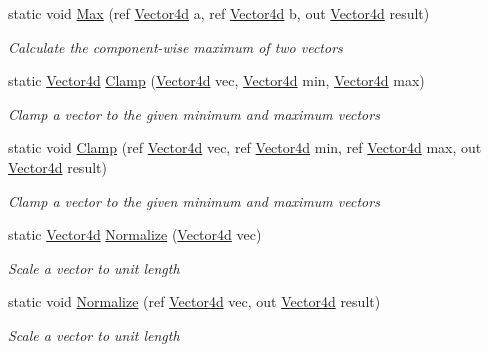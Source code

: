 \begin{DoxyCompactItemize}
static void \hyperlink{struct_open_t_k_1_1_vector4d_a1fc8d4efea89c6e4e92691ee4f2e05e4}{Max} (ref \hyperlink{struct_open_t_k_1_1_vector4d}{Vector4d} a, ref \hyperlink{struct_open_t_k_1_1_vector4d}{Vector4d} b, out \hyperlink{struct_open_t_k_1_1_vector4d}{Vector4d} result)
\begin{DoxyCompactList}\small\item\em Calculate the component-\/wise maximum of two vectors \end{DoxyCompactList}\item 
static \hyperlink{struct_open_t_k_1_1_vector4d}{Vector4d} \hyperlink{struct_open_t_k_1_1_vector4d_a7de635a7d3a8772bb756d91711bcf08f}{Clamp} (\hyperlink{struct_open_t_k_1_1_vector4d}{Vector4d} vec, \hyperlink{struct_open_t_k_1_1_vector4d}{Vector4d} min, \hyperlink{struct_open_t_k_1_1_vector4d}{Vector4d} max)
\begin{DoxyCompactList}\small\item\em Clamp a vector to the given minimum and maximum vectors \end{DoxyCompactList}\item 
static void \hyperlink{struct_open_t_k_1_1_vector4d_a00380f4c255c721c67f1af92ebaf84b0}{Clamp} (ref \hyperlink{struct_open_t_k_1_1_vector4d}{Vector4d} vec, ref \hyperlink{struct_open_t_k_1_1_vector4d}{Vector4d} min, ref \hyperlink{struct_open_t_k_1_1_vector4d}{Vector4d} max, out \hyperlink{struct_open_t_k_1_1_vector4d}{Vector4d} result)
\begin{DoxyCompactList}\small\item\em Clamp a vector to the given minimum and maximum vectors \end{DoxyCompactList}\item 
static \hyperlink{struct_open_t_k_1_1_vector4d}{Vector4d} \hyperlink{struct_open_t_k_1_1_vector4d_a40c271a72e977c382667f68dc9b7b879}{Normalize} (\hyperlink{struct_open_t_k_1_1_vector4d}{Vector4d} vec)
\begin{DoxyCompactList}\small\item\em Scale a vector to unit length \end{DoxyCompactList}\item 
static void \hyperlink{struct_open_t_k_1_1_vector4d_a460519a12434fba159f8a3d474b63027}{Normalize} (ref \hyperlink{struct_open_t_k_1_1_vector4d}{Vector4d} vec, out \hyperlink{struct_open_t_k_1_1_vector4d}{Vector4d} result)
\begin{DoxyCompactList}\small\item\em Scale a vector to unit length \end{DoxyCompactList}\item 

\end{DoxyCompactItemize}
